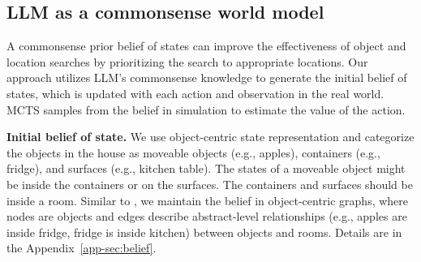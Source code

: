 \subsection{LLM as a commonsense world model}
\label{sec:model}
A commonsense prior belief of states can improve the effectiveness of object and location searches by prioritizing the search to appropriate locations.
Our approach utilizes LLM's commonsense knowledge to generate the initial belief of states, which is updated with each action and observation in the real world. MCTS samples from the belief in simulation to estimate the value of the action.

\textbf{Initial belief of state.}\label{para:state}
We use object-centric state representation and categorize the objects in the house as moveable objects (e.g., apples), containers (e.g., fridge), and surfaces (e.g., kitchen table). The states of a moveable object might be inside the containers or on the surfaces. The containers and surfaces should be inside a room. Similar to \cite{li2022pre, puig2020watch}, we maintain the belief in object-centric graphs, where nodes are objects and edges describe abstract-level relationships (e.g., apples are inside fridge, fridge is inside kitchen) between objects and rooms. Details are in the Appendix~\ref{app-sec:belief}. 

